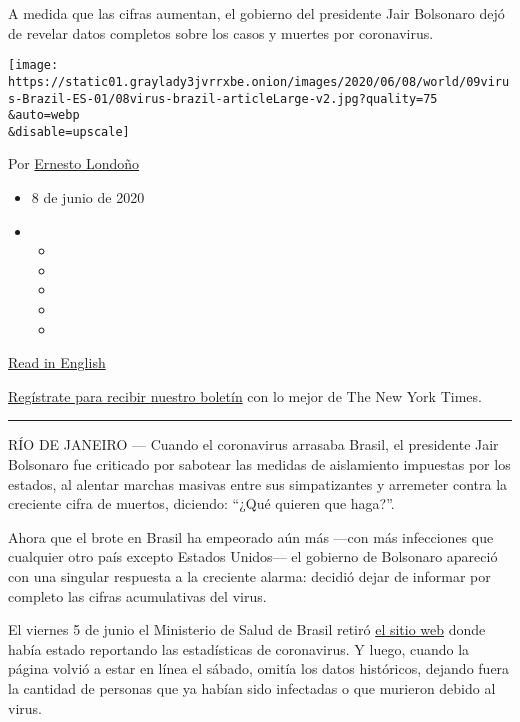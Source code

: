 A medida que las cifras aumentan, el gobierno del presidente Jair
Bolsonaro dejó de revelar datos completos sobre los casos y muertes por
coronavirus.

\texttt{[image: https://static01.graylady3jvrrxbe.onion/images/2020/06/08/world/09virus-Brazil-ES-01/08virus-brazil-articleLarge-v2.jpg?quality=75\\\&auto=webp\\\&disable=upscale]}

Por \href{https://www.nytimes3xbfgragh.onion/by/ernesto-londono}{Ernesto
Londoño}

\begin{itemize}
\item
  8 de junio de 2020
\item
  \begin{itemize}
  \item
  \item
  \item
  \item
  \item
  \end{itemize}
\end{itemize}

\href{https://www.nytimes3xbfgragh.onion/2020/06/08/world/americas/brazil-coronavirus-statistics.html}{Read
in English}

\href{https://www.nytimes3xbfgragh.onion/newsletters/el-times}{Regístrate
para recibir nuestro boletín} con lo mejor de The New York Times.

\begin{center}\rule{0.5\linewidth}{\linethickness}\end{center}

RÍO DE JANEIRO --- Cuando el coronavirus arrasaba Brasil, el presidente
Jair Bolsonaro fue criticado por sabotear las medidas de aislamiento
impuestas por los estados, al alentar marchas masivas entre sus
simpatizantes y arremeter contra la creciente cifra de muertos,
diciendo: ``¿Qué quieren que haga?''.

Ahora que el brote en Brasil ha empeorado aún más ---con más infecciones
que cualquier otro país excepto Estados Unidos--- el gobierno de
Bolsonaro apareció con una singular respuesta a la creciente alarma:
decidió dejar de informar por completo las cifras acumulativas del
virus.

El viernes 5 de junio el Ministerio de Salud de Brasil retiró
\href{https://covid.saude.gov.br/}{el sitio web} donde había estado
reportando las estadísticas de coronavirus. Y luego, cuando la página
volvió a estar en línea el sábado, omitía los datos históricos, dejando
fuera la cantidad de personas que ya habían sido infectadas o que
murieron debido al virus.


